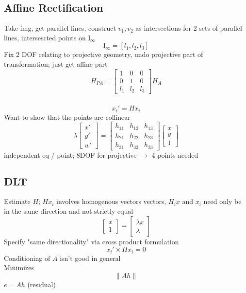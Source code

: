 \documentclass{article}
\begin{document}
\subsection{Affine Rectification}
Take img, get parallel lines, construct $v_1,v_2$ as intersections for 2 sets of 
parallel lines, intersescted points on $\mathbf l_\infty$
\[
    \mathbf l_\infty = [l_1, l_2, l_3]
\]
\noindent
Fix 2 DOF relating to projective geometry, undo projective part of transformation;
just get affine part 
\[
    H_{PA} = \begin{bmatrix}
        1 & 0 & 0 \\
        0 & 1 & 0 \\
        l_1 & l_2 & l_3
    \end{bmatrix} H_A
\]

\subsubsection{}
\[
    x_i' = Hx_i
\]\noindent
Want to show that the points are collinear
\[
   \lambda  
   \begin{bmatrix}
    x' \\ y' \\ w'
   \end{bmatrix} =
   \begin{bmatrix}
    h_{11} & h_{12} & h_{13} \\
    h_{21} & h_{22} & h_{23} \\
    h_{31} & h_{32} & h_{33}
   \end{bmatrix}
   \begin{bmatrix}
    x \\y \\ 1
   \end{bmatrix}
\] 
 independent eq / point; 8DOF for projective $\to$ 4 points needed


\subsection{DLT}
Estimate $H$; $Hx_i$ involves homogenous vectors
vectors, $H_ix$ and $x_i$ need only be in the same direction and not strictly equal
\[
    \begin{bmatrix}
        x \\ 1
    \end{bmatrix} \equiv \begin{bmatrix}
        \lambda x \\ \lambda
    \end{bmatrix}
\]
\noindent
Specify "same directionality" via cross product formulation
\[
    x_i' \times Hx_i = 0
\]
Conditioning of $A$ isn't good in general
\\
Minimizes
\[
    \| Ah \|
\]
$e = Ah$ (residual)
\end{document}
